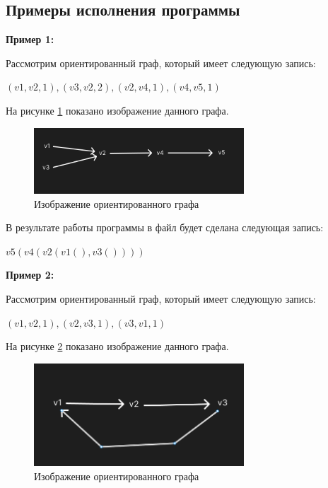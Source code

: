 \documentclass[bachelor, och, otchet]{template}
\begin{document}
    \subsection{Примеры исполнения программы}


    \textbf{Пример 1:}

    Рассмотрим ориентированный граф, который имеет следующую запись:

    \begin{center}
        $(v1, v2, 1), (v3 , v2, 2), (v2, v4, 1), (v4, v5, 1)$
    \end{center}

    На рисунке \ref{p21} показано изображение данного графа.

    \begin{figure}[H]
        \centering
        \includegraphics[width=0.7\textwidth]{pics/2.1.png}
        \caption{Изображение ориентированного графа}
        \label{p21}
    \end{figure} 

    В результате работы программы в файл будет сделана следующая запись:

    \begin{center}
        $v5(v4(v2(v1(), v3())))$
    \end{center}


    \textbf{Пример 2:}

    Рассмотрим ориентированный граф, который имеет следующую запись:

    \begin{center}
        $(v1, v2, 1), (v2, v3, 1), (v3, v1, 1)$
    \end{center}

    На рисунке \ref{p22} показано изображение данного графа.

    \begin{figure}[H]
        \centering
        \includegraphics[width=0.7\textwidth]{pics/2.2.png}
        \caption{Изображение ориентированного графа}
        \label{p22}
    \end{figure} 
\end{document}
